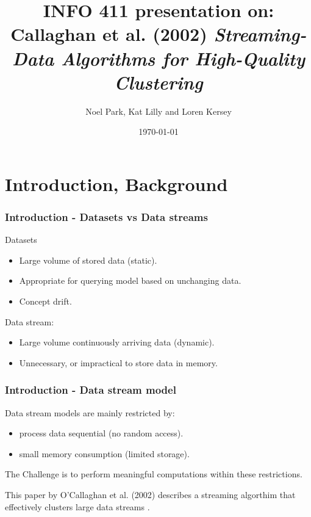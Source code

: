 \documentclass{beamer}
\title{{\small INFO 411 presentation on:} \\ \bigskip Callaghan et
  al. (2002) {\em Streaming-Data Algorithms for High-Quality
    Clustering}} \author{Noel Park, Kat Lilly and Loren Kersey}
\date{\today}
\begin{document}
\frame{\titlepage}

\section[Outline]{}
\frame{\tableofcontents}

\section{Introduction, Background}

\frame
{
  \frametitle{Introduction - Datasets vs Data streams}

  Datasets
  \begin{itemize}
    \item Large volume of stored data (static).
    \item Appropriate for querying model based on unchanging data.
    \item Concept drift.
    \newline
  \end{itemize}

  Data stream:
  \begin{itemize}
    \item Large volume continuously arriving data (dynamic).
    \item Unnecessary, or impractical to store data in memory.
  \end{itemize}
}

\frame
{
  \frametitle{Introduction - Data stream model}

  Data stream models are mainly restricted by:
  \begin{itemize}
    \item process data sequential (no random access).
    \item small memory consumption (limited storage).
    \newline
  \end{itemize}

  The Challenge is to perform meaningful computations within these restrictions. \newline

  This paper by O'Callaghan et al. (2002) describes a streaming
  algorthim that effectively clusters large data streams \cite{2002streaming}.

}
\end{document}
